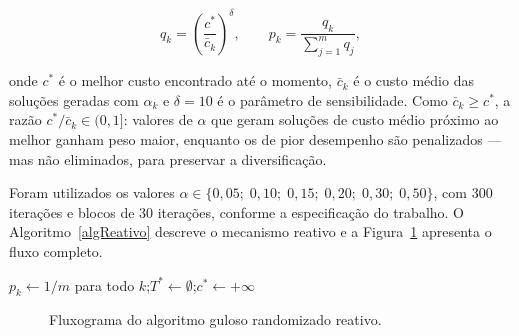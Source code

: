 \documentclass[12pt]{article}
\begin{document}
\begin{equation}
    q_k = \left(\frac{c^*}{\bar{c}_k}\right)^{\delta}, \qquad p_k = \frac{q_k}{\displaystyle\sum_{j=1}^{m} q_j},
\end{equation}

onde $c^*$ é o melhor custo encontrado até o momento, $\bar{c}_k$ é o custo médio das soluções geradas com $\alpha_k$ e $\delta = 10$ é o parâmetro de sensibilidade. Como $\bar{c}_k \geq c^*$, a razão $c^*/\bar{c}_k \in (0,1]$: valores de $\alpha$ que geram soluções de custo médio próximo ao melhor ganham peso maior, enquanto os de pior desempenho são penalizados --- mas não eliminados, para preservar a diversificação.

Foram utilizados os valores $\alpha \in \{0{,}05;\; 0{,}10;\; 0{,}15;\; 0{,}20;\; 0{,}30;\; 0{,}50\}$, com 300 iterações e blocos de 30 iterações, conforme a especificação do trabalho. O Algoritmo~\ref{algReativo} descreve o mecanismo reativo e a Figura~\ref{fig:fluxograma} apresenta o fluxo completo.

\begin{algorithm}[H]
\caption{Esau--Williams Guloso Randomizado Reativo}
\label{algReativo}

$p_k \leftarrow 1/m$ para todo $k$;\quad $T^* \leftarrow \emptyset$;\quad $c^* \leftarrow +\infty$\;
\end{algorithm}

\begin{figure}[ht]
\centering
\resizebox{0.55\textwidth}{!}{
    
}
\caption{Fluxograma do algoritmo guloso randomizado reativo.}
\label{fig:fluxograma}
\end{figure}


\end{document}
